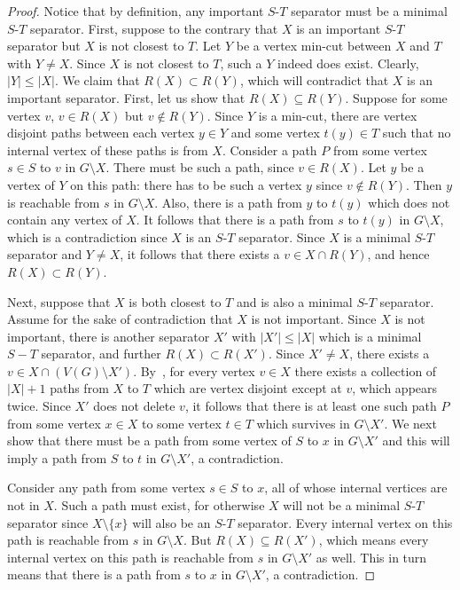 \documentclass[11pt]{article}
\begin{document}
\begin{proof}
Notice that by definition, any important $S$-$T$ separator must be a minimal $S$-$T$ separator. First, suppose to the contrary that $X$ is an important $S$-$T$ separator but $X$ is not closest to $T$. Let $Y$ be a vertex min-cut between $X$ and $T$ with $Y \neq X$. Since $X$ is not closest to $T$, such a $Y$ indeed does exist. Clearly, $|Y| \leq |X|$. We claim that $R(X) \subset R(Y)$, which will contradict that $X$ is an important separator. First, let us show that $R(X) \subseteq R(Y)$. Suppose for some vertex $v$, $v \in R(X)$ but $v \notin R(Y)$. Since $Y$ is a min-cut, there are vertex disjoint paths between each vertex $y \in Y$ and some vertex $t(y) \in T$ such that no internal vertex of these paths is from $X$. Consider a path $P$ from some vertex $s \in S$ to $v$ in $G \setminus X$. There must be such a path, since $v \in R(X)$. Let $y$ be a vertex of $Y$ on this path: there has to be such a vertex $y$ since $v \notin R(Y)$. Then $y$ is reachable from $s$ in $G \setminus X$. Also, there is a path from $y$ to $t(y)$ which does not contain any vertex of $X$. It follows that there is a path from $s$ to $t(y)$ in $G \setminus X$, which is a contradiction since $X$ is an $S$-$T$ separator. Since $X$ is a minimal $S$-$T$ separator and $Y \neq X$, it follows that there exists a $v \in X \cap R(Y)$, and hence $R(X) \subset R(Y)$. 


Next, suppose that $X$ is both closest to $T$ and is also a minimal $S$-$T$ separator. Assume for the sake of contradiction that $X$ is not important. Since $X$ is not important, there is another separator $X'$ with $|X'| \leq |X|$ which is a minimal $S-T$ separator, and further $R(X) \subset R(X')$. Since $X' 
\neq X$, there exists a $v \in X \cap (V(G) \setminus X')$. By~, for every vertex $v \in X$ there exists a collection of $|X| + 1$ paths from $X$ to $T$ which are vertex disjoint except at $v$, which appears twice. Since $X'$ does not delete $v$, it follows that there is at least one such path $P$ from some vertex $x \in X$ to some vertex $t \in T$ which survives in $G \setminus X'$. We next show that there must be a path from some vertex of $S$ to $x$ in $G \setminus X'$ and this will imply a path from $S$ to $t$ in $G \setminus X'$, a contradiction.

Consider any path from some vertex $s \in S$ to $x$, all of whose internal vertices are not in $X$. Such a path must exist, for otherwise $X$ will not be a minimal $S$-$T$ separator since $X \setminus \{x\}$ will also be an $S$-$T$ separator. Every internal vertex on this path is reachable from $s$ in  $G \setminus X$. But $R(X) \subseteq R(X')$, which means every internal vertex on this path is reachable from $s$ in $G \setminus X'$ as well. This in turn means that there is a path from $s$ to $x$ in $G \setminus X'$, a contradiction.
\end{proof}
\end{document}
